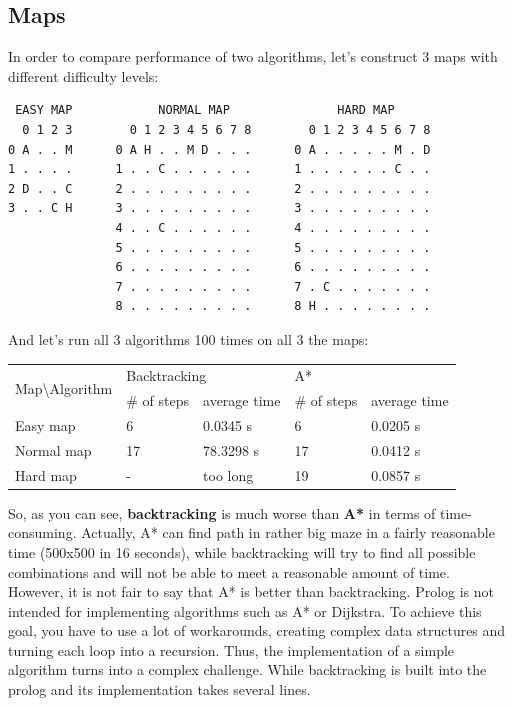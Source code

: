 \documentclass{article}
\begin{document}
\subsection{Maps}
In order to compare performance of two algorithms, let's construct 3 maps with different difficulty levels:
\\

\begin{verbatim}
 EASY MAP            NORMAL MAP               HARD MAP
  0 1 2 3        0 1 2 3 4 5 6 7 8        0 1 2 3 4 5 6 7 8
0 A . . M      0 A H . . M D . . .      0 A . . . . . M . D
1 . . . .      1 . . C . . . . . .      1 . . . . . . C . .
2 D . . C      2 . . . . . . . . .      2 . . . . . . . . .
3 . . C H      3 . . . . . . . . .      3 . . . . . . . . .
               4 . . C . . . . . .      4 . . . . . . . . .
               5 . . . . . . . . .      5 . . . . . . . . .
               6 . . . . . . . . .      6 . . . . . . . . .
               7 . . . . . . . . .      7 . C . . . . . . .
               8 . . . . . . . . .      8 H . . . . . . . . 
\end{verbatim}

And let's run all 3 algorithms 100 times on all 3 the maps:
\begin{center}
    

\begin{tabular}{|l|l|l|l|l|}
\hline
\multirow{2}{*}{Map\textbackslash{}Algorithm} & \multicolumn{2}{l|}{Backtracking} & \multicolumn{2}{l|}{A*} \\ \cline{2-5} 
                                              & \# of steps         & average time & \# of steps    & average time\\ \hline
Easy map                                      & 6                   &0.0345 s     & 6              &0.0205 s \\ \hline
Normal map                                    & 17                 & 78.3298 s    & 17             &0.0412 s        \\ \hline
Hard map                                      &-&too long&19&0.0857 s\\ \hline
\end{tabular}
\end{center}

So, as you can see, \textbf{backtracking} is much worse than \textbf{A*} in terms of time-consuming. Actually, A* can find path in rather big maze in a fairly reasonable time (500x500 in 16 seconds), while backtracking will try to find all possible combinations and will not be able to meet a reasonable amount of time.
\\
However, it is not fair to say that A* is better than backtracking. Prolog is not intended for implementing algorithms such as A* or Dijkstra. To achieve this goal, you have to use a lot of workarounds, creating complex data structures and turning each loop into a recursion. Thus, the implementation of a simple algorithm turns into a complex challenge. While backtracking is built into the prolog and its implementation takes several lines.
\end{document}
